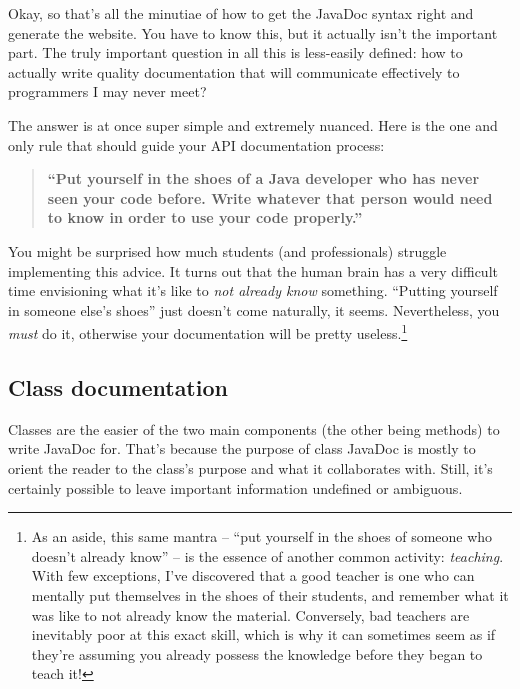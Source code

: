 Okay, so that's all the minutiae of how to get the JavaDoc syntax right and
generate the website. You have to know this, but it actually isn't the
important part. The truly important question in all this is less-easily
defined: how to actually write quality documentation that will communicate
effectively to programmers I may never meet?

\pagebreak
The answer is at once super simple and extremely nuanced. Here is the one and
only rule that should guide your API documentation process:

\begin{shaded}
\begin{quote}

\textbf{\textsf{``Put yourself in the shoes of a Java developer who has never
seen your code before. Write whatever that person would need to know in order
to use your code properly.''}}

\end{quote}
\end{shaded}

You might be surprised how much students (and professionals) struggle
implementing this advice. It turns out that the human brain has a very
difficult time envisioning what it's like to \textit{not already know}
something. ``Putting yourself in someone else's shoes'' just doesn't come
naturally, it seems. Nevertheless, you \textit{must} do it, otherwise your
documentation will be pretty useless.\footnote{As an aside, this same mantra
-- ``put yourself in the shoes of someone who doesn't already know'' -- is the
essence of another common activity: \textit{teaching}. With few exceptions,
I've discovered that a good teacher is one who can mentally put themselves in
the shoes of their students, and remember what it was like to not already know
the material. Conversely, bad teachers are inevitably poor at this exact
skill, which is why it can sometimes seem as if they're assuming you already
possess the knowledge before they began to teach it!}


\subsection{Class documentation}

Classes are the easier of the two main components (the other being methods) to
write JavaDoc for. That's because the purpose of class JavaDoc is mostly to
orient the reader to the class's purpose and what it collaborates with. Still,
it's certainly possible to leave important information undefined or ambiguous.

